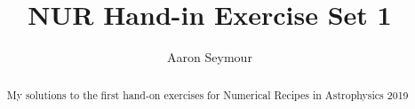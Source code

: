\documentclass[a4paper,10pt]{article}
\title{NUR Hand-in Exercise Set 1}
\author{Aaron Seymour}
\begin{document}
\maketitle

\begin{abstract}
 My solutions to the first hand-on exercises for Numerical Recipes in Astrophysics 2019
\end{abstract}






\end{document}
